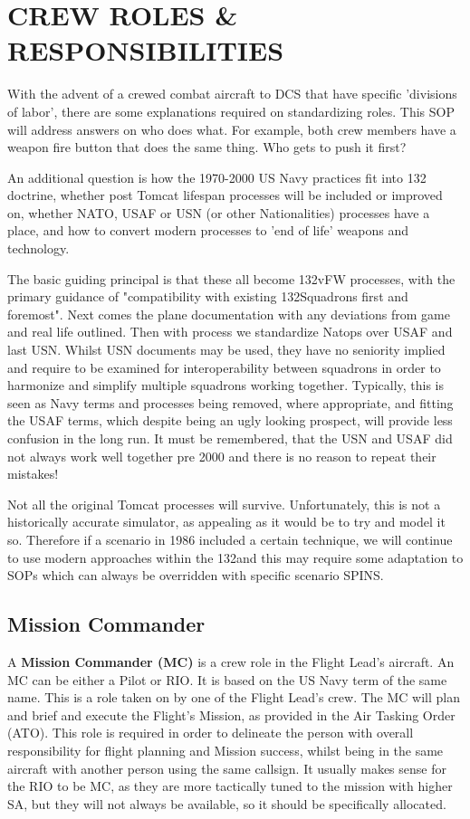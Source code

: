 \section{CREW ROLES \& RESPONSIBILITIES}

With the advent of a crewed combat aircraft to DCS that have specific
'divisions of labor', there are some explanations required on standardizing
roles. This SOP will address answers on who does what. For example, both crew
members have a weapon fire button that does the same thing. Who gets to push it
first?

An additional question is how the 1970-2000 US Navy practices fit into 132\nd
doctrine, whether post Tomcat lifespan processes will be included or improved
on, whether NATO, USAF or USN (or other Nationalities) processes have a place,
and how to convert modern processes to 'end of life' weapons and technology.

The basic guiding principal is that these all become 132\nd vFW processes, with
the primary guidance of "compatibility with existing 132\nd Squadrons first and
foremost". Next comes the plane documentation with any deviations from game and
real life outlined. Then with process we standardize Natops over USAF and last
USN. Whilst USN documents may be used, they have no seniority implied and
require to be examined for interoperability between squadrons in order to
harmonize and simplify multiple squadrons working together. Typically, this is
seen as Navy terms and processes being removed, where appropriate, and fitting
the USAF terms, which despite being an ugly looking prospect, will provide less
confusion in the long run. It must be remembered, that the USN and USAF did not
always work well together pre 2000 and there is no reason to repeat their
mistakes!

Not all the original Tomcat processes will survive. Unfortunately, this is not a
historically accurate simulator, as appealing as it would be to try and model it
so. Therefore if a scenario in 1986 included a certain technique, we will
continue to use modern approaches within the 132\nd and this may require some
adaptation to SOPs which can always be overridden with specific scenario SPINS.

\subsection*{Mission Commander}

A \textbf{Mission Commander (MC)} is a crew role in the Flight Lead's aircraft.
An MC can be either a Pilot or RIO. It is based on the US Navy term of the same
name.  This is a role taken on by one of the Flight Lead's crew. The MC will
plan and brief and execute the Flight's Mission, as provided in the Air Tasking
Order (ATO). This role is required in order to delineate the person with
overall responsibility for flight planning and Mission success, whilst being in
the same aircraft with another person using the same callsign. It usually makes
sense for the RIO to be MC, as they are more tactically tuned to the mission
with higher SA, but they will not always be available, so it should be
specifically allocated.

